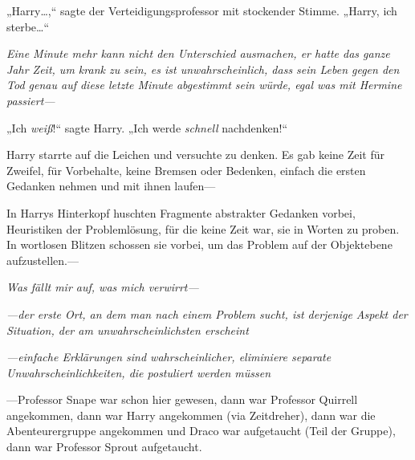 „Harry…,“ sagte der Verteidigungsprofessor mit stockender Stimme. „Harry, ich sterbe…“

\emph{Eine Minute mehr kann nicht den Unterschied ausmachen, er hatte das \emph{ganze Jahr} Zeit, um krank zu sein, es ist \emph{unwahrscheinlich}, dass sein Leben gegen den Tod genau auf diese letzte Minute abgestimmt sein würde, egal was mit Hermine passiert—}

„Ich \emph{weiß}!“ sagte Harry. „Ich werde \emph{schnell} nachdenken!“

Harry starrte auf die Leichen und versuchte zu denken. Es gab keine Zeit für Zweifel, für Vorbehalte, keine Bremsen oder Bedenken, einfach die ersten Gedanken nehmen und mit ihnen laufen—

In Harrys Hinterkopf huschten Fragmente abstrakter Gedanken vorbei, Heuristiken der Problemlösung, für die keine Zeit war, sie in Worten zu proben. In wortlosen Blitzen schossen sie vorbei, um das Problem auf der Objektebene aufzustellen.—

\emph{Was fällt mir auf, was mich verwirrt—}

\emph{—der erste Ort, an dem man nach einem Problem sucht, ist derjenige Aspekt der Situation, der am unwahrscheinlichsten erscheint}

\emph{—einfache Erklärungen sind wahrscheinlicher, eliminiere separate Unwahrscheinlichkeiten, die postuliert werden müssen}

—Professor Snape war schon hier gewesen, dann war Professor Quirrell angekommen, dann war Harry angekommen (via Zeitdreher), dann war die Abenteurergruppe angekommen und Draco war aufgetaucht (Teil der Gruppe), dann war Professor Sprout aufgetaucht.

